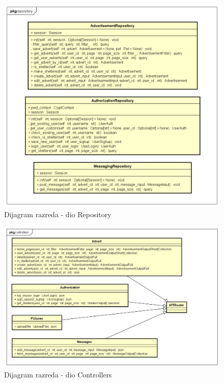			\begin{figure}[H]
				\includegraphics[scale=0.6]{dijagrami/dijagramiRazreda/repo.PNG} %
				\centering
				\caption{Dijagram razreda - dio Repository}
				\label{fig:drRepository}
			\end{figure}

			\begin{figure}[H]
				\includegraphics[scale=0.6]{dijagrami/dijagramiRazreda/Controllers.PNG} %
				\centering
				\caption{Dijagram razreda - dio Controllers}
				\label{fig:drControllers}
			\end{figure}
			
